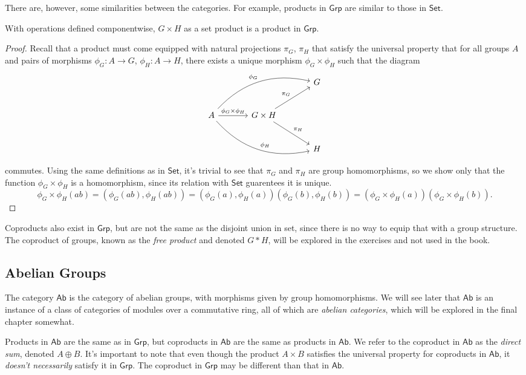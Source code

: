 There are, however, some similarities between the categories. For example, products in $\mathsf{Grp}$ are similar to those in $\mathsf{Set}$.
\begin{proposition}\label{prp:2.3.3}
	With operations defined componentwise, $G\times H$ as a set product is a product in $\mathsf{Grp}$.
\end{proposition}
\begin{proof}
	Recall that a product must come equipped with natural projections $\pi_G$, $\pi_H$ that satisfy the universal property that for all groups $A$ and pairs of morphisms $\phi_G : A \to G$, $\phi_H : A \to H$, there exists a unique morphism $\phi_G \times \phi _H$ such that the diagram
	\[\begin{tikzcd}[row sep=2.5em, column sep=3.5em]
		&&G\\
		A\arrow[rru, bend left, " \phi_G"]\arrow[rrd, bend right, "\phi_H"]\arrow[r,"\phi_G\times \phi _H"]&G\times H\arrow[ur, "\pi_G"]\arrow[dr, "\pi_H"]\\
														   &&H
	\end{tikzcd}\]
	commutes. Using the same definitions as in  $\mathsf{Set}$, it's trivial to see that $\pi_G$ and $\pi _H$ are group homomorphisms, so we show only that the function $\phi_G \times \phi_H$ is a homomorphism, since its relation with $\mathsf{Set}$ guarentees it is unique.
	\[
		\phi_G\times \phi_H(ab)=(\phi_G(ab),\phi_H(ab))=(\phi_G(a),\phi_H(a))(\phi_G(b),\phi_H(b))=(\phi_G\times \phi_H(a))(\phi_G\times \phi _H(b))
	.\]
\end{proof}

Coproducts also exist in $\mathsf{Grp}$, but are not the same as the disjoint union in set, since there is no way to equip that with a group structure. The coproduct of groups, known as the \emph{free product} and denoted $G*H$, will be explored in the exercises and not used in the book.

\subsection{Abelian Groups}
The category $\mathsf{Ab}$ is the category of abelian groups, with morphisms given by group homomorphisms. We will see later that $\mathsf{Ab}$ is an instance of a class of categories of modules over a commutative ring, all of which are \emph{abelian categories}, which will be explored in the final chapter somewhat.

Products in $\mathsf{Ab}$ are the same as in $\mathsf{Grp}$, but coproducts in $\mathsf{Ab}$ are the same as products in $\mathsf{Ab}$. We refer to the coproduct in $\mathsf{Ab}$ as the \emph{direct sum}, denoted $A\oplus B$. It's important to note that even though the product $A\times B$ satisfies the universal property for coproducts in $\mathsf{Ab}$, it \emph{doesn't necessarily} satisfy it in $\mathsf{Grp}$. The coproduct in $\mathsf{Grp}$ may be different than that in $\mathsf{Ab}$.

